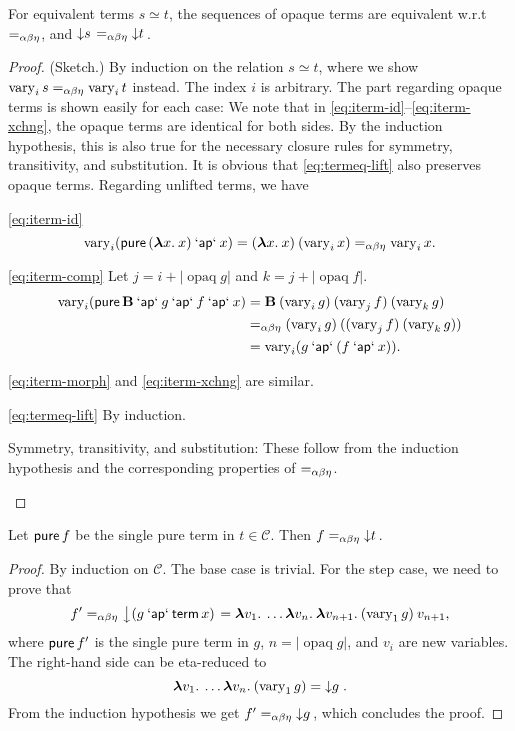 \begin{lemma}\label{thm:unlift-equiv}
For equivalent terms $s \simeq t$, the sequences of opaque terms are equivalent
w.r.t $=_{\alpha\beta\eta}$, and $\left\downarrow s\right. =_{\alpha\beta\eta} \left\downarrow t\right.$.
\end{lemma}
\begin{proof} (Sketch.)
By induction on the relation $s \simeq t$, where we show
$\operatorname{vary}_i s =_{\alpha\beta\eta} \operatorname{vary}_i t$ instead.
The index $i$ is arbitrary.
The part regarding opaque terms is shown easily for each case:
We note that in \eqref{eq:iterm-id}--\eqref{eq:iterm-xchng}, the opaque terms
are identical for both sides.
By the induction hypothesis, this is also true for the necessary closure rules
for symmetry, transitivity, and substitution.
It is obvious that \eqref{eq:termeq-lift} also preserves opaque terms.
Regarding unlifted terms, we have
\begin{prfcases}
\item \eqref{eq:iterm-id}
	\[ \operatorname{vary}_i (\operatorname{\mathsf{pure}}{({\boldsymbol\lambda} x.\>x)} \mathbin{\mathsf{`ap`}} x) =
		({\boldsymbol\lambda} x.\>x) \> (\operatorname{vary}_i x) =_{\alpha\beta\eta} \operatorname{vary}_i x. \]
\item \eqref{eq:iterm-comp}
	Let $j = i + |\operatorname{opaq} g|$ and $k = j + |\operatorname{opaq} f|$.
	\begin{align*}
		\operatorname{vary}_i (\operatorname{\mathsf{pure}} \mathbf{B} \mathbin{\mathsf{`ap`}} g \mathbin{\mathsf{`ap`}} f \mathbin{\mathsf{`ap`}} x) &=
		\mathbf{B} \> (\operatorname{vary}_i g) \> (\operatorname{vary}_j f) \> (\operatorname{vary}_k g) \\
		&=_{\alpha\beta\eta} (\operatorname{vary}_i g) \> ((\operatorname{vary}_j f) \> (\operatorname{vary}_k g)) \\
		&= \operatorname{vary}_i (g \mathbin{\mathsf{`ap`}} (f \mathbin{\mathsf{`ap`}} x)).
	\end{align*}
\item \eqref{eq:iterm-morph} and \eqref{eq:iterm-xchng} are similar.
\item \eqref{eq:termeq-lift} By induction.
\item Symmetry, transitivity, and substitution: These follow from the induction
	hypothesis and the corresponding properties of $=_{\alpha\beta\eta}$.
\end{prfcases}
\end{proof}

\begin{lemma}\label{thm:unlift-head}
Let $\operatorname{\mathsf{pure}} f$ be the single pure term in $t \in \mathcal{C}$.
Then $f =_{\alpha\beta\eta} \left\downarrow t\right.$.
\end{lemma}
\begin{proof}
By induction on $\mathcal{C}$.
The base case is trivial.
For the step case, we need to prove that
\[ f' =_{\alpha\beta\eta} \left\downarrow (g \mathbin{\mathsf{`ap`}} \operatorname{\mathsf{term}} x)\right. =
	{\boldsymbol\lambda} v_1.\>\dots {\boldsymbol\lambda} v_n.\>{\boldsymbol\lambda} v_{n+1}.\>(\operatorname{vary}_1 g) \> v_{n+1}, \]
where $\operatorname{\mathsf{pure}} f'$ is the single pure term in $g$, $n = |\operatorname{opaq} g|$,
and $v_i$ are new variables.
The right-hand side can be eta-reduced to
\[ {\boldsymbol\lambda} v_1.\>\dots {\boldsymbol\lambda} v_n.\>(\operatorname{vary}_1 g) = \left\downarrow g\right.. \]
From the induction hypothesis we get $f' =_{\alpha\beta\eta} \left\downarrow g\right.$, which
concludes the proof.
\end{proof}

